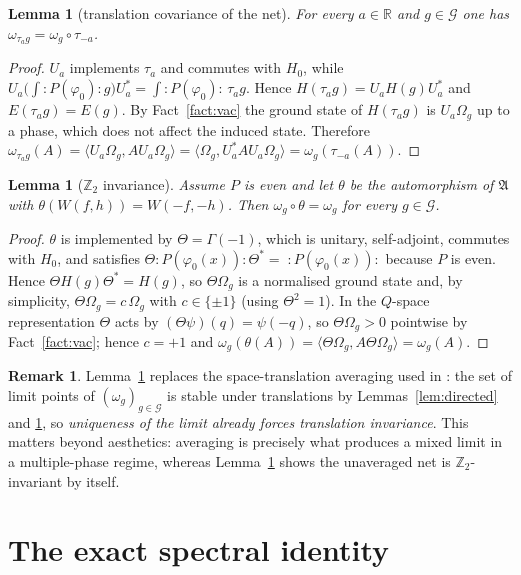 \documentclass[11pt,a4paper]{article}
\theoremstyle{plain}
\newtheorem{lemma}[theorem]{Lemma}
\theoremstyle{definition}
\newtheorem{remark}[theorem]{Remark}
\newcommand{\A}{\mathfrak{A}}
\newcommand{\G}{\mathcal{G}}
\newcommand{\R}{\mathbb{R}}
\newcommand{\Z}{\mathbb{Z}}
\newcommand{\Om}{\Omega}
\newcommand{\ip}[2]{\langle #1,#2\rangle}
\begin{document}
\begin{lemma}[translation covariance of the net]\label{lem:transl}
For every $a\in\R$ and $g\in\G$ one has $\omega_{\tau_ag}=\omega_g\circ\tau_{-a}$.
\end{lemma}

\begin{proof}
$U_a$ implements $\tau_a$ and commutes with $H_0$, while
$U_a\bigl(\int:\!P(\varphi_0)\!:g\bigr)U_a^*=\int:\!P(\varphi_0)\!:\,\tau_ag$. Hence
$H(\tau_ag)=U_aH(g)U_a^*$ and $E(\tau_ag)=E(g)$. By Fact~\ref{fact:vac} the ground state of
$H(\tau_ag)$ is $U_a\Om_g$ up to a phase, which does not affect the induced state. Therefore
$\omega_{\tau_ag}(A)=\ip{U_a\Om_g}{AU_a\Om_g}=\ip{\Om_g}{U_a^*AU_a\Om_g}
=\omega_g(\tau_{-a}(A))$.
\end{proof}

\begin{lemma}[$\Z_2$ invariance]\label{lem:z2}
Assume $P$ is even and let $\theta$ be the automorphism of $\A$ with $\theta(W(f,h))=W(-f,-h)$.
Then $\omega_g\circ\theta=\omega_g$ for every $g\in\G$.
\end{lemma}

\begin{proof}
$\theta$ is implemented by $\Theta=\Gamma(-1)$, which is unitary, self-adjoint, commutes with
$H_0$, and satisfies $\Theta:\!P(\varphi_0(x))\!:\Theta^*=\;:\!P(\varphi_0(x))\!:$ because $P$ is
even. Hence $\Theta H(g)\Theta^*=H(g)$, so $\Theta\Om_g$ is a normalised ground state and, by
simplicity, $\Theta\Om_g=c\,\Om_g$ with $c\in\{\pm1\}$ (using $\Theta^2=1$). In the $Q$-space
representation $\Theta$ acts by $(\Theta\psi)(q)=\psi(-q)$, so $\Theta\Om_g>0$ pointwise by
Fact~\ref{fact:vac}; hence $c=+1$ and
$\omega_g(\theta(A))=\ip{\Theta\Om_g}{A\Theta\Om_g}=\omega_g(A)$.
\end{proof}

\begin{remark}\label{rem:noaveraging}
Lemma~\ref{lem:transl} replaces the space-translation averaging used in
\cite[eq.~(2.5)]{GJIII}: the set of limit points of $(\omega_g)_{g\in\G}$ is stable under
translations by Lemmas~\ref{lem:directed} and \ref{lem:transl}, so \emph{uniqueness of the limit
already forces translation invariance}. This matters beyond aesthetics: averaging is precisely
what produces a mixed limit in a multiple-phase regime, whereas Lemma~\ref{lem:z2} shows the
unaveraged net is $\Z_2$-invariant by itself.
\end{remark}

\section{The exact spectral identity}\label{sec:spectral}
\end{document}
